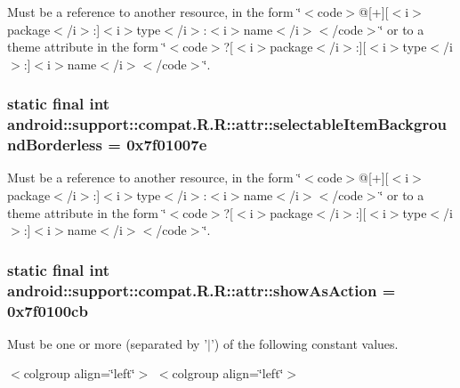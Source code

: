 Must be a reference to another resource, in the form \char`\"{}$<$code$>$@\mbox{[}+\mbox{]}\mbox{[}$<$i$>$package$<$/i$>$:\mbox{]}$<$i$>$type$<$/i$>$:$<$i$>$name$<$/i$>$$<$/code$>$\char`\"{} or to a theme attribute in the form \char`\"{}$<$code$>$?\mbox{[}$<$i$>$package$<$/i$>$:\mbox{]}\mbox{[}$<$i$>$type$<$/i$>$:\mbox{]}$<$i$>$name$<$/i$>$$<$/code$>$\char`\"{}. \hypertarget{classandroid_1_1support_1_1compat_1_1_r_1_1attr_497f279f9008efcd2481f4ebf8e5b0bd}{
\subsubsection[{selectableItemBackgroundBorderless}]{\setlength{\rightskip}{0pt plus 5cm}static final int android::support::compat.R.R::attr::selectableItemBackgroundBorderless = 0x7f01007e}}
\label{classandroid_1_1support_1_1compat_1_1_r_1_1attr_497f279f9008efcd2481f4ebf8e5b0bd}


Must be a reference to another resource, in the form \char`\"{}$<$code$>$@\mbox{[}+\mbox{]}\mbox{[}$<$i$>$package$<$/i$>$:\mbox{]}$<$i$>$type$<$/i$>$:$<$i$>$name$<$/i$>$$<$/code$>$\char`\"{} or to a theme attribute in the form \char`\"{}$<$code$>$?\mbox{[}$<$i$>$package$<$/i$>$:\mbox{]}\mbox{[}$<$i$>$type$<$/i$>$:\mbox{]}$<$i$>$name$<$/i$>$$<$/code$>$\char`\"{}. \hypertarget{classandroid_1_1support_1_1compat_1_1_r_1_1attr_b6914c57ee5abb5f71e4419e96eb58c2}{
\subsubsection[{showAsAction}]{\setlength{\rightskip}{0pt plus 5cm}static final int android::support::compat.R.R::attr::showAsAction = 0x7f0100cb}}
\label{classandroid_1_1support_1_1compat_1_1_r_1_1attr_b6914c57ee5abb5f71e4419e96eb58c2}


Must be one or more (separated by '$|$') of the following constant values. \begin{TabularC}{0}
\hline
\end{TabularC}
$<$colgroup align=\char`\"{}left\char`\"{}$>$ $<$colgroup align=\char`\"{}left\char`\"{}$>$ 

